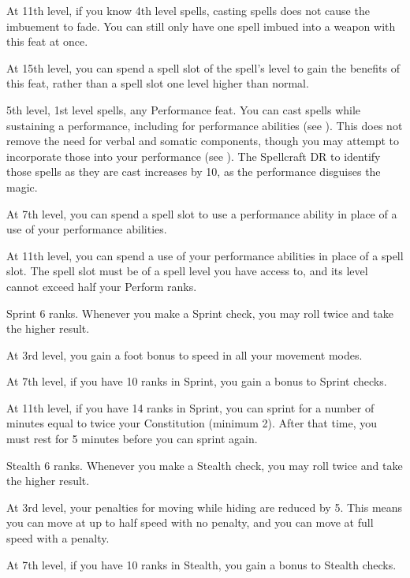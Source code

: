     At 11th level, if you know 4th level spells, casting spells does not cause the imbuement to fade.
    You can still only have one spell imbued into a weapon with this feat at once.

    At 15th level, you can spend a spell slot of the spell's level to gain the benefits of this feat, rather than a spell slot one level higher than normal.

    \featpres 5th level, 1st level spells, any Performance feat.
    \featben You can cast spells while sustaining a performance, including for performance abilities (see ).
    This does not remove the need for verbal and somatic components, though you may attempt to incorporate those into your performance (see ).
    The Spellcraft DR to identify those spells as they are cast increases by 10, as the performance disguises the magic.

    At 7th level, you can spend a spell slot to use a performance ability in place of a use of your performance abilities.

    At 11th level, you can spend a use of your performance abilities in place of a spell slot.
    The spell slot must be of a spell level you have access to, and its level cannot exceed half your Perform ranks.

    \featpre Sprint 6 ranks.
    \featben Whenever you make a Sprint check, you may roll twice and take the higher result.

    At 3rd level, you gain a  foot bonus to speed in all your movement modes.

    At 7th level, if you have 10 ranks in Sprint, you gain a  bonus to Sprint checks.

    At 11th level, if you have 14 ranks in Sprint, you can sprint for a number of minutes equal to twice your Constitution (minimum 2).
    After that time, you must rest for 5 minutes before you can sprint again.

    \featpre Stealth 6 ranks.
    \featben Whenever you make a Stealth check, you may roll twice and take the higher result.

    At 3rd level, your penalties for moving while hiding are reduced by 5.
    This means you can move at up to half speed with no penalty, and you can move at full speed with a  penalty.

    At 7th level, if you have 10 ranks in Stealth, you gain a  bonus to Stealth checks.

